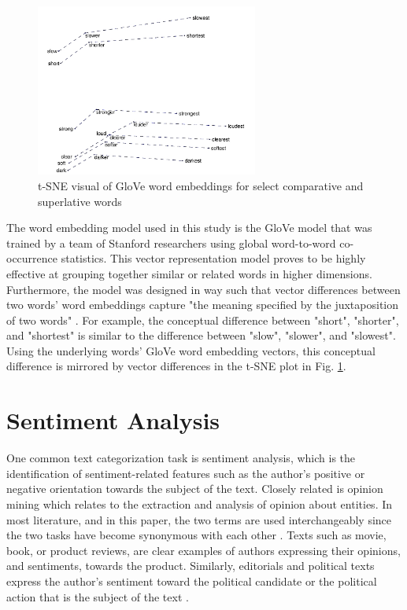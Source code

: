 \begin{figure}[h]
\centering
\captionsetup{justification=centering,width=0.95\textwidth}
\centerline{\includegraphics[width=0.65\textwidth]{comparativeVsSuperlative.png}}
\caption[t-SNE Visual of Comparative and Superlative Words]{
    t-SNE visual of GloVe word embeddings for select comparative and superlative words \cite{comparativeVsSuperlative}
}
\label{fig:comparativeVsSuperlative}
\end{figure}


The word embedding model used in this study is the GloVe model that was trained by a team of Stanford researchers using global word-to-word co-occurrence statistics.  This vector representation model proves to be highly effective at grouping together similar or related words in higher dimensions.  Furthermore, the model was designed in way such that vector differences between two words' word embeddings capture "the meaning specified by the juxtaposition of two words" \cite{glove}.  For example, the conceptual difference between "short", "shorter", and "shortest" is similar to the difference between "slow", "slower", and "slowest".  Using the underlying words' GloVe word embedding vectors, this conceptual difference is mirrored by vector differences in the t-SNE plot in Fig. \ref{fig:comparativeVsSuperlative}.


\section{Sentiment Analysis} \label{sentimentAnalysisSection}

One common text categorization task is sentiment analysis, which is the identification of sentiment-related features such as the author's positive or negative orientation towards the subject of the text.  Closely related is opinion mining which relates to the extraction and analysis of opinion about entities.  In most literature, and in this paper, the two terms are used interchangeably since the two tasks have become synonymous with each other \cite{sentimentApp}.  Texts such as movie, book, or product reviews, are clear examples of authors expressing their opinions, and sentiments, towards the product.  Similarly, editorials and political texts express the author's sentiment toward the political candidate or the political action that is the subject of the text \cite{nbSentiment}.

